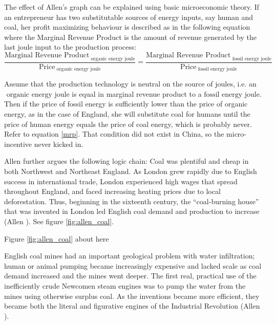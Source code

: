 \documentclass[12pt]{article}
\numberwithin{equation}{section}
\begin{document}
		The effect of Allen's graph can be explained using basic microeconomic theory. If an entrepreneur has two substitutable sources of energy inputs, say human and coal, her profit maximizing behaviour is described as in the following equation where the Marginal Revenue Product is the amount of revenue generated by the last joule input to the production process:
		\begin{equation}
		\label{mrp}
		\frac{\text{Marginal Revenue Product}_{\text{ organic energy joule}}}{\text{Price}_{\text{ organic energy joule}}} = \frac{\text{Marginal Revenue Product}_{\text{ fossil energy joule}}}{\text{Price}_{\text{ fossil energy joule}}}
		\end{equation}
		
		Assume that the production technology is neutral on the source of joules, i.e. an $\text{ organic energy joule}$ is equal in marginal revenue product to a $\text{fossil energy joule}$. Then if the price of fossil energy is sufficiently lower than the price of organic energy, as in the case of England, she will substitute coal for humans until the price of human energy equals the price of coal energy, which is probably never. Refer to equation \ref{mrp}. That condition did not exist in China, so the micro-incentive never kicked in.
		
		Allen further argues the following logic chain: Coal was plentiful and cheap in both Northwest and Northeast England. As London grew rapidly due to English success in international trade, London experienced high wages that spread throughout England, and faced increasing heating prices due to local deforestation. Thus, beginning in the sixteenth century, the ``coal-burning house'' that was invented in London led English coal demand and production to increase (Allen \citeyear[p.~82]{allen_british_2009}).  See figure \ref{fig:allen_coal}.
		
\begin{center}
Figure \ref{fig:allen_coal} about here
\end{center}
		


		English coal mines had an important geological problem with water infiltration; human or animal pumping became increasingly expensive and lacked scale as coal demand increased and the mines went deeper. The first real, practical use of the inefficiently crude Newcomen steam engines was to pump the water from the mines using otherwise surplus coal. As the inventions became more efficient, they became both the literal and figurative engines of the Industrial Revolution (Allen \citeyear[pp.~86 -- 93]{allen_british_2009}).
		
\end{document}
